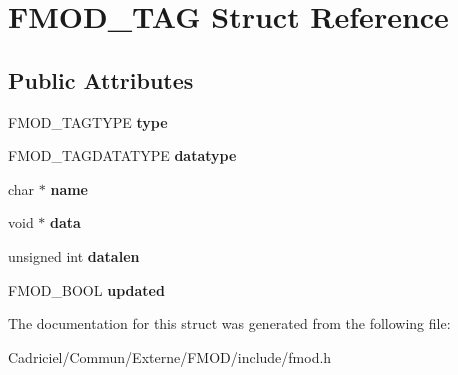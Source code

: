 \hypertarget{struct_f_m_o_d___t_a_g}{\section{F\-M\-O\-D\-\_\-\-T\-A\-G Struct Reference}
\label{struct_f_m_o_d___t_a_g}
}
\subsection*{Public Attributes}
\begin{DoxyCompactItemize}
\item 
\hypertarget{struct_f_m_o_d___t_a_g_ad891c5f78e72ffeebc0f39e34e5b1b20}{F\-M\-O\-D\-\_\-\-T\-A\-G\-T\-Y\-P\-E {\bfseries type}}\label{struct_f_m_o_d___t_a_g_ad891c5f78e72ffeebc0f39e34e5b1b20}

\item 
\hypertarget{struct_f_m_o_d___t_a_g_acc0f4bf92ee045d5828ba7eccc3c4c23}{F\-M\-O\-D\-\_\-\-T\-A\-G\-D\-A\-T\-A\-T\-Y\-P\-E {\bfseries datatype}}\label{struct_f_m_o_d___t_a_g_acc0f4bf92ee045d5828ba7eccc3c4c23}

\item 
\hypertarget{struct_f_m_o_d___t_a_g_a200d18627ec871638bb7df841a77b2ab}{char $\ast$ {\bfseries name}}\label{struct_f_m_o_d___t_a_g_a200d18627ec871638bb7df841a77b2ab}

\item 
\hypertarget{struct_f_m_o_d___t_a_g_a86247271797eb33118a5fff813c1e548}{void $\ast$ {\bfseries data}}\label{struct_f_m_o_d___t_a_g_a86247271797eb33118a5fff813c1e548}

\item 
\hypertarget{struct_f_m_o_d___t_a_g_a589281f4f1adc717798744722ec43761}{unsigned int {\bfseries datalen}}\label{struct_f_m_o_d___t_a_g_a589281f4f1adc717798744722ec43761}

\item 
\hypertarget{struct_f_m_o_d___t_a_g_a0358f4afc9957d3d3254691c3118d90a}{F\-M\-O\-D\-\_\-\-B\-O\-O\-L {\bfseries updated}}\label{struct_f_m_o_d___t_a_g_a0358f4afc9957d3d3254691c3118d90a}

\end{DoxyCompactItemize}


The documentation for this struct was generated from the following file\-:\begin{DoxyCompactItemize}
\item 
Cadriciel/\-Commun/\-Externe/\-F\-M\-O\-D/include/fmod.\-h\end{DoxyCompactItemize}
